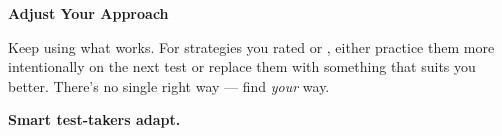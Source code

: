 {\begin{tcolorbox}[
    enhanced,
    colback=funYellowLight,
    colframe=funYellow!60,
    arc=10pt,
    boxrule=1pt,
    left=6mm, right=6mm, top=4mm, bottom=4mm,
]
{\bfseries\color{funYellowDark} \faLightbulb\hspace{2mm}Adjust Your Approach}

\vspace{2mm}

Keep using what works. For strategies you rated \faMeh{} or \faThumbsDown{}, either practice them more intentionally on the next test or replace them with something that suits you better. There's no single right way — find \textit{your} way.
\end{tcolorbox}

\vspace{4mm}

\begin{center}
{\large\bfseries\color{funRedDark} \faTools\hspace{2mm}Smart test-takers adapt.\hspace{2mm}\faTools}
\end{center}

}
\newpage
